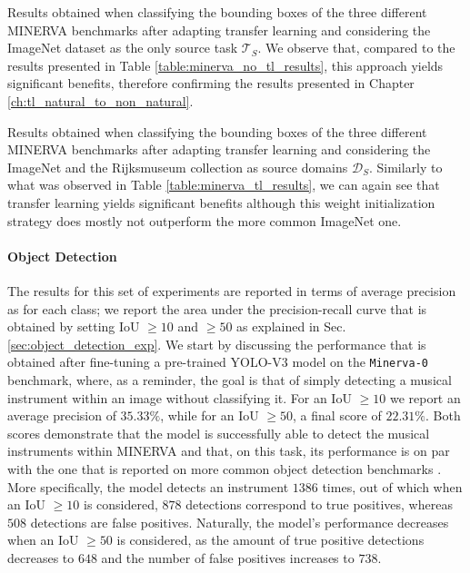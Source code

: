 \begin{table}[ht!]
	\caption{Results obtained when classifying the bounding boxes of the three different MINERVA benchmarks after adapting transfer learning and considering the ImageNet dataset as the only source task $\mathcal{T}_S$. We observe that, compared to the results presented in Table \ref{table:minerva_no_tl_results}, this approach yields significant benefits, therefore confirming the results presented in Chapter \ref{ch:tl_natural_to_non_natural}.}
\resizebox{\columnwidth}{!}{%
}
\label{table:minerva_tl_results}
\end{table}


\begin{table}[ht!]
	\caption{Results obtained when classifying the bounding boxes of the three different MINERVA benchmarks after adapting transfer learning and considering the ImageNet and the Rijksmuseum collection as source domains $\mathcal{D}_S$. Similarly to what was observed in Table \ref{table:minerva_tl_results}, we can again see that transfer learning yields significant benefits although this weight initialization strategy does mostly not outperform the more common ImageNet one.}
\resizebox{\columnwidth}{!}{%
}
\label{table:minerva_rijks_results}
\end{table}


\paragraph{Object Detection}
The results for this set of experiments are reported in terms of average precision as for each class; we report the area under the precision-recall curve that is obtained by setting IoU $\geq10$ and $\geq50$ as explained in Sec. \ref{sec:object_detection_exp}. We start by discussing the performance that is obtained after fine-tuning a pre-trained YOLO-V3 model on the \texttt{Minerva-0} benchmark, where, as a reminder, the goal is that of simply detecting a musical instrument within an image without classifying it. For an IoU $\geq 10$ we report an average precision of $35.33\%$, while for an IoU $\geq 50$, a final score of $22.31\%$. Both scores demonstrate that the model is successfully able to detect the musical instruments within MINERVA and that, on this task, its performance is on par with the one that is reported on more common object detection benchmarks \cite{lin2014microsoft}. More specifically, the model detects an instrument $1386$ times, out of which when an IoU $\geq 10$ is considered, $878$ detections correspond to true positives, whereas $508$ detections are false positives. Naturally, the model's performance decreases when an IoU $\geq 50$ is considered, as the amount of true positive detections decreases to $648$ and the number of false positives increases to $738$.

